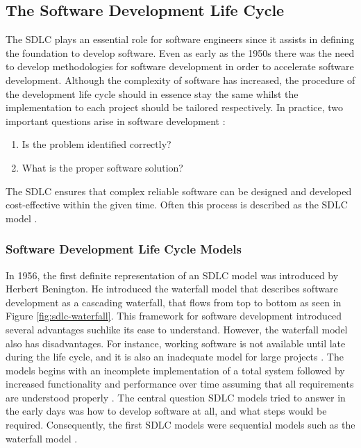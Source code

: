 \subsection{The Software Development Life Cycle}
The SDLC plays an essential role for software engineers since it assists in defining the foundation to develop software. Even as early as the 1950s there was the need to develop methodologies for software development in order to accelerate software development. Although the complexity of software has increased, the procedure of the development life cycle should in essence stay the same whilst the implementation to each project should be tailored respectively. In practice, two important questions arise in software development \cite{langer2012guide}:
\begin{enumerate}
    \item Is the problem identified correctly?
    \item What is the proper software solution?
\end{enumerate}
The SDLC ensures that complex reliable software can be designed and developed cost-effective within the given time. Often this process is described as the SDLC model \cite{S_2017}. 

\subsubsection{Software Development Life Cycle Models}
In 1956, the first definite representation of an SDLC model was introduced by Herbert Benington. He introduced the waterfall model that describes software development as a cascading waterfall, that flows from top to bottom as seen in Figure \ref{fig:sdlc-waterfall}. This framework for software development introduced several advantages suchlike its ease to understand. However, the waterfall model also has disadvantages. For instance, working software is not available until late during the life cycle, and it is also an inadequate model for large projects \cite{S_2017}. The models begins with an incomplete implementation of a total system followed by increased functionality and performance over time assuming that all requirements are understood properly \cite{Shah_2016}. The central question SDLC models tried to answer in the early days was how to develop software at all, and what steps would be required. Consequently, the first SDLC models were sequential models such as the waterfall model \cite{Kneuper_2017}. 

